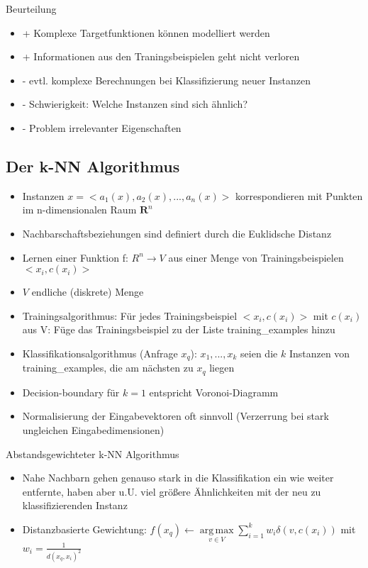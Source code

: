 \documentclass[paper=a4, fontsize=11pt]{scrartcl} %
\numberwithin{equation}{section} %
\numberwithin{figure}{section} %
\numberwithin{table}{section} %
\DeclareMathOperator*{\argmax}{arg\,max}
\begin{document}
Beurteilung
\begin{itemize}
\item + Komplexe Targetfunktionen können modelliert werden
\item + Informationen aus den Traningsbeispielen geht nicht verloren
\item - evtl. komplexe Berechnungen bei Klassifizierung neuer Instanzen
\item - Schwierigkeit: Welche Instanzen sind sich ähnlich?
\item - Problem irrelevanter Eigenschaften
\end{itemize}

\subsection{Der k-NN Algorithmus}

\begin{itemize}
\item Instanzen $x = <a_1(x),a_2(x),...,a_n(x)>$ korrespondieren mit Punkten im n-dimensionalen Raum $\mathbf{R}^n$
\item Nachbarschaftsbeziehungen sind definiert durch die Euklidsche Distanz
\item Lernen einer Funktion f: $R^n \rightarrow V$ aus einer Menge von Trainingsbeispielen $<x_i,c(x_i)>$
\item $V$ endliche (diskrete) Menge
\item Trainingsalgorithmus: Für jedes Trainingsbeispiel $<x_i,c(x_i)>$ mit $c(x_i)$ aus V: Füge das Trainingsbeispiel zu der Liste training\_examples hinzu
\item Klassifikationsalgorithmus (Anfrage $x_q$): $x_1,...,x_k$ seien die $k$ Instanzen von training\_examples, die am nächsten zu $x_q$ liegen
\item Decision-boundary für $k=1$ entspricht Voronoi-Diagramm
\item Normalisierung der Eingabevektoren oft sinnvoll (Verzerrung bei stark ungleichen Eingabedimensionen)
\end{itemize}

Abstandsgewichteter k-NN Algorithmus
\begin{itemize}
\item Nahe Nachbarn gehen genauso stark in die Klassifikation ein wie weiter entfernte, haben aber u.U. viel größere Ähnlichkeiten mit der neu zu klassifizierenden Instanz
\item Distanzbasierte Gewichtung: $f(x_q) \leftarrow \argmax\limits_{v \in V} \sum\limits_{i=1}^k w_i \delta(v,c(x_i))$ mit $w_i = \frac{1}{d(x_q,x_i)^2}$
\end{itemize}
\end{document}
